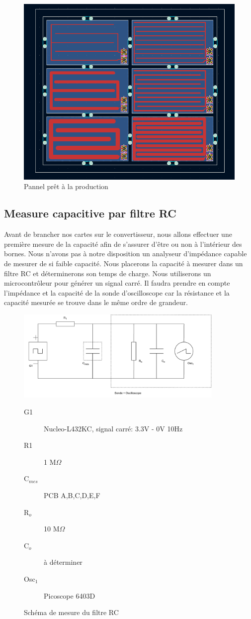 \begin{figure}[!ht]
\centering
 \includegraphics[width=12cm]{pannel.png}
 \caption{Pannel prêt à la production}
\end{figure}

\newpage

\subsection{Measure capacitive par filtre RC}

Avant de brancher nos cartes sur le convertisseur, nous allons effectuer une première mesure de la capacité afin de s'assurer d'être ou non à l'intérieur des bornes. Nous n'avons pas à notre disposition un analyseur d’impédance capable de mesurer de si faible capacité. Nous placerons la capacité à mesurer dans un filtre RC et déterminerons son temps de charge. Nous utiliserons un microcontrôleur pour générer un signal carré. Il faudra prendre en compte l’impédance et la capacité de la sonde d'oscilloscope car la résistance et la capacité mesurée se trouve dans le même ordre de grandeur.


\begin{figure}[!ht]
\centering
 \includegraphics[width=10cm]{schemaMesure.pdf}
 \begin{description}
 \item[G1] Nucleo-L432KC, signal carré: 3.3V - 0V 10Hz
 \item[R1] 1 M$\Omega$
 \item[C$_{mes}$] PCB A,B,C,D,E,F
 \item[R$_o$] 10 M$\Omega$
 \item[C$_o$] à déterminer
 \item[Osc$_1$] Picoscope 6403D
\end{description}
 \caption{Schéma de mesure du filtre RC}
\end{figure}

